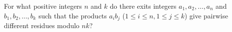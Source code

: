 For what positive integers $n$ and $k$ do there exits integers $a_1,a_2,\dots,a_n$ and $b_1,b_2,\dots,b_k$ such that the products $a_ib_j$ ($1\le i\le n,1\le j\le k$) give pairwise different residues modulo $nk$?